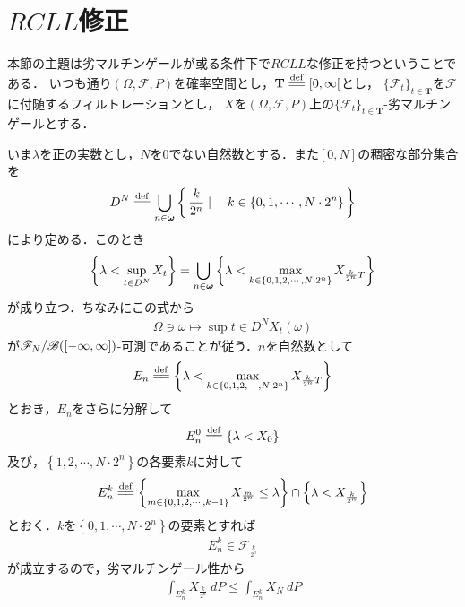 \section{$RCLL$修正}
	本節の主題は劣マルチンゲールが或る条件下で$RCLL$な修正を持つということである．
	いつも通り$(\Omega,\mathscr{F},P)$を確率空間とし，$\mathbf{T} \defeq [0,\infty[$とし，
	$\{\mathscr{F}_t\}_{t \in \mathbf{T}}$を$\mathscr{F}$に付随するフィルトレーションとし，
	$X$を$(\Omega,\mathscr{F},P)$上の$\{\mathscr{F}_t\}_{t \in \mathbf{T}}$-劣マルチンゲールとする．
	
	いま$\lambda$を正の実数とし，$N$を$0$でない自然数とする．また$[0,N]$の稠密な部分集合を
	\begin{align}
		D^N \defeq \bigcup_{n \in \Natural} \Set{\frac{k}{2^n}}{k \in \{0,1,\cdots,N \cdot 2^n\}}
	\end{align}
	により定める．このとき
	\begin{align}
		\left\{\lambda < \operatorname*{sup}_{t \in D^N} X_t\right\}
		= \bigcup_{n \in {\boldsymbol \omega}} \left\{\lambda < \max_{k \in \left\{0,1,2,\cdots,N \cdot 2^n\right\}} X_{\frac{k}{2^n}T}\right\}
	\end{align}
	が成り立つ．ちなみにこの式から
	\begin{align}
		\Omega \ni \omega \longmapsto \sup{t \in D^N}X_t(\omega)
	\end{align}
	が$\mathscr{F}_N/\mathscr{B}([-\infty,\infty])$-可測であることが従う．$n$を自然数として
	\begin{align}
		E_n \defeq  \left\{\lambda < \max_{k \in \left\{0,1,2,\cdots,N \cdot 2^n\right\}} X_{\frac{k}{2^n}T}\right\}
	\end{align}
	とおき，$E_n$をさらに分解して
	\begin{align}
		E_n^0 \defeq \left\{\lambda < X_0\right\}
	\end{align}
	及び，$\left\{1,2,\cdots,N \cdot 2^n\right\}$の各要素$k$に対して
	\begin{align}
		E_n^k \defeq \left\{ \max_{m \in \left\{0,1,2,\cdots,k-1\right\}} X_{\frac{m}{2^n}} \leq \lambda \right\} \cap \left\{\lambda < X_{\frac{k}{2^n}}\right\}
	\end{align}
	とおく．$k$を$\left\{0,1,\cdots,N \cdot 2^n\right\}$の要素とすれば
	\begin{align}
		E_n^k \in \mathscr{F}_{\frac{k}{2^n}}
	\end{align}
	が成立するので，劣マルチンゲール性から
	\begin{align}
		\int_{E_n^k} X_{\frac{k}{2^n}}\ dP \leq \int_{E_n^k} X_N\ dP
	\end{align}

